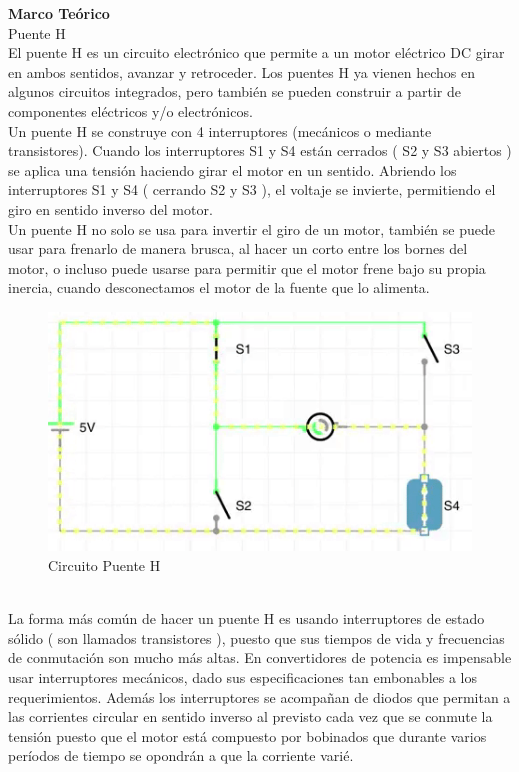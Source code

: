 \documentclass[12pt,a4paper]{article}
\begin{document}
\textbf{Marco Teórico}\\
Puente H\\
El puente H  es un circuito electrónico que permite a un motor eléctrico DC girar en ambos sentidos, avanzar y retroceder. Los puentes H ya vienen hechos en algunos circuitos integrados, pero también se pueden construir a partir de componentes eléctricos y/o electrónicos.\\
Un puente H se construye con 4 interruptores (mecánicos o mediante transistores). Cuando los interruptores S1 y S4 están cerrados ( S2 y S3 abiertos ) se aplica una tensión haciendo girar el motor en un sentido. Abriendo los interruptores S1 y S4 ( cerrando S2 y S3 ), el voltaje se invierte, permitiendo el giro en sentido inverso del motor.\\
Un puente H no solo se usa para invertir el giro de un motor, también se puede usar para frenarlo de manera brusca, al hacer un corto entre los bornes del motor, o incluso puede usarse para permitir que el motor frene bajo su propia inercia, cuando desconectamos el motor de la fuente que lo alimenta.\\
\begin{figure}[hbtp]
\centering
\includegraphics[scale=0.75]{Pictures/Puente_H.PNG}
\caption{Circuito Puente H}
\end{figure}\\

La forma más común de hacer un puente H es usando interruptores de estado sólido ( son llamados transistores ), puesto que sus tiempos de vida y frecuencias de conmutación son mucho más altas. En convertidores de potencia es impensable usar interruptores mecánicos, dado sus especificaciones tan embonables a los requerimientos. Además los interruptores se acompañan de diodos que permitan a las corrientes circular en sentido inverso al previsto cada vez que se conmute la tensión puesto que el motor está compuesto por bobinados que durante varios períodos de tiempo se opondrán a que la corriente varié.
\end{document}
